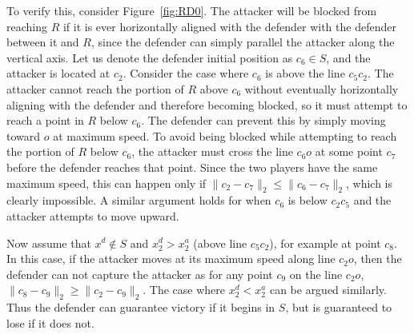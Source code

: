 \documentclass[letterpaper, 10 pt, conference]{ieeeconf}  %
\numberwithin{algorithm}{section}
\begin{document}
To verify this, consider Figure~\ref{fig:RD0}. The attacker will be blocked from reaching $R$ if it is ever horizontally aligned with the defender with the defender between it and $R$, since the defender can simply parallel the attacker along the vertical axis. Let us denote the defender initial position as $c_6\in S$, and the attacker is located at $c_2$. Consider the case where $c_6$ is above the line $c_5c_2$. The attacker cannot reach the portion of $R$ above $c_6$ without eventually horizontally aligning with the defender and therefore becoming blocked, so it must attempt to reach a point in $R$ below $c_6$.  The defender can prevent this by simply moving toward $o$ at maximum speed.  To avoid being blocked while attempting to reach the portion of $R$ below $c_6$, the attacker must cross the line $c_6o$ at some point $c_7$ before the defender reaches that point.  Since the two players have the same maximum speed, this can happen only if $\|c_2-c_7\|_2\le\|c_6-c_7\|_2$, which is clearly impossible.  A similar argument holds for when $c_6$ is below $c_2c_5$ and the attacker attempts to move upward.


Now assume that $x^d\notin S$ and $x^d_2>x^a_2$ (above line $c_5c_2$), for example at point $c_8$. In this case, if the attacker moves at its maximum speed along line $c_2o$, then the defender can not capture the attacker as for any point $c_9$ on the line $c_2o$, $\|c_8-c_9\|_2\ge \|c_2-c_9\|_2$. The case where $x^d_2<x^a_2$ can be argued similarly.  Thus the defender can guarantee victory if it begins in $S$, but is guaranteed to lose if it does not.
\end{document}
